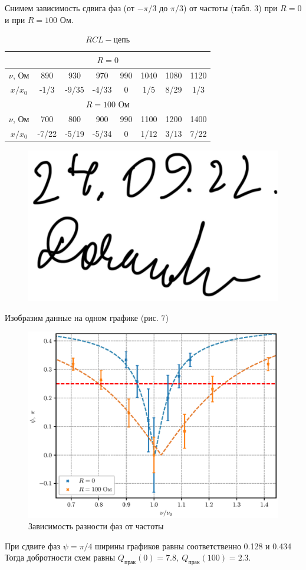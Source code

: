 \documentclass[12pt,a4paper]{article}
\begin{document}
Снимем зависимость сдвига фаз (от $-\pi/3$ до  $\pi/3$) от частоты (табл. 3) при $R = 0$ и при $R=100$ Ом.
\begin{table}[H]
    \centering
    \begin{tabular}{|c|c|c|c|c|c|c|c|}
        \hline
        \multicolumn{8}{|c|}{$R = 0$} \\
        \hline
        $\nu$, Ом &890&930&970&990&1040&1080&1120\\
        \hline
        $x/x_0$ &-1/3&-9/35&-4/33&0&1/5&8/29&1/3\\
        \hline
        \multicolumn{8}{|c|}{$R = 100$ Ом} \\
        \hline
        $\nu$, Ом &700&800&900&990&1100&1200&1400\\
        \hline
        $x/x_0$ &-7/22&-5/19&-5/34&0&1/12&3/13&7/22\\
        \hline
    \end{tabular}
    \caption{$RCL - $цепь}
\end{table}
\begin{figure}[H]
    \flushright
    \includegraphics[width=0.15\linewidth]{pics/signa.jpeg}
\end{figure}
\newpage
Изобразим данные на одном графике (рис. 7)

\begin{figure}[H]
    \centering
    \includegraphics[width=0.7\linewidth]{pics/RLC.eps}
    \caption{Зависимость разности фаз от частоты}
\end{figure}

При сдвиге фаз $\psi = \pi/4$ ширины графиков равны соответственно %
0.128 и 0.434
Тогда добротности схем равны $Q_{прак}(0) = 7.8,\ Q_{прак}(100) = 2.3$.
\end{document}
